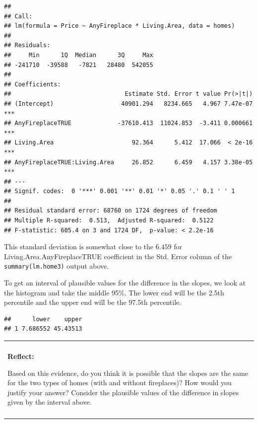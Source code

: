 \documentclass[
]{book}
\newenvironment{Shaded}{\begin{snugshade}}{\end{snugshade}}
\newcommand{\DataTypeTok}[1]{\textcolor[rgb]{0.13,0.29,0.53}{#1}}
\newcommand{\FloatTok}[1]{\textcolor[rgb]{0.00,0.00,0.81}{#1}}
\newcommand{\KeywordTok}[1]{\textcolor[rgb]{0.13,0.29,0.53}{\textbf{#1}}}
\newcommand{\NormalTok}[1]{#1}
\newcommand{\OperatorTok}[1]{\textcolor[rgb]{0.81,0.36,0.00}{\textbf{#1}}}
\newcommand{\StringTok}[1]{\textcolor[rgb]{0.31,0.60,0.02}{#1}}
\newenvironment{reflect}
{
    \begin{center}
    
    \begin{tabular}{|p{0.8\textwidth}|}
    \rowcolor{LightBlue}
    \hline\\
    \rowcolor{LightBlue}
    \textbf{Reflect:}
}
{
    \\\rowcolor{LightBlue}
    \\\hline
    \end{tabular} 
    \end{center}
}
\begin{document}
\begin{verbatim}
## 
## Call:
## lm(formula = Price ~ AnyFireplace * Living.Area, data = homes)
## 
## Residuals:
##     Min      1Q  Median      3Q     Max 
## -241710  -39588   -7821   28480  542055 
## 
## Coefficients:
##                                Estimate Std. Error t value Pr(>|t|)    
## (Intercept)                   40901.294   8234.665   4.967 7.47e-07 ***
## AnyFireplaceTRUE             -37610.413  11024.853  -3.411 0.000661 ***
## Living.Area                      92.364      5.412  17.066  < 2e-16 ***
## AnyFireplaceTRUE:Living.Area     26.852      6.459   4.157 3.38e-05 ***
## ---
## Signif. codes:  0 '***' 0.001 '**' 0.01 '*' 0.05 '.' 0.1 ' ' 1
## 
## Residual standard error: 68760 on 1724 degrees of freedom
## Multiple R-squared:  0.513,	Adjusted R-squared:  0.5122 
## F-statistic: 605.4 on 3 and 1724 DF,  p-value: < 2.2e-16
\end{verbatim}

This standard deviation is somewhat close to the \(6.459\) for Living.Area.AnyFireplaceTRUE coefficient in the Std. Error column of the \texttt{summary(lm.home3)} output above.

To get an interval of plausible values for the difference in the slopes, we look at the histogram and take the middle 95\%. The lower end will be the 2.5th percentile and the upper end will be the 97.5th percentile.

\begin{Shaded}
\end{Shaded}

\begin{verbatim}
##      lower    upper
## 1 7.686552 45.43513
\end{verbatim}

\begin{reflect}
Based on this evidence, do you think it is possible that the slopes are
the same for the two types of homes (with and without fireplaces)? How
would you justify your answer? Consider the plausible values of the
difference in slopes given by the interval above.
\end{reflect}
\end{document}
